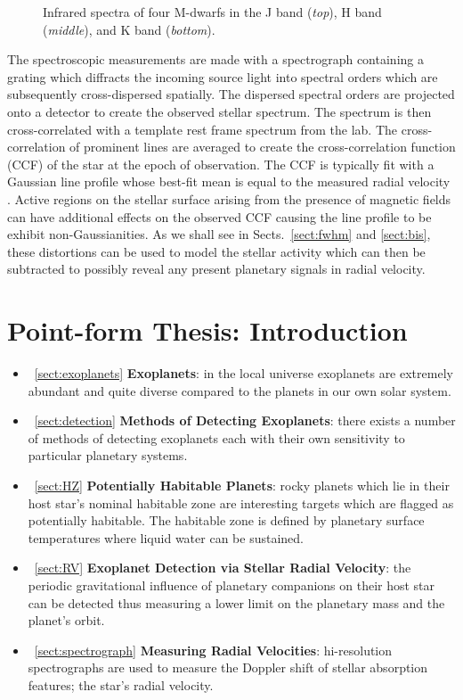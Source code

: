 \begin{figure}
\centering
\caption{Infrared spectra of four M-dwarfs in the J band (\emph{top}), H band 
(\emph{middle}), and K band (\emph{bottom}). \label{fig:spectra}}
\end{figure}

The spectroscopic measurements are made with a spectrograph containing a grating which 
diffracts the incoming source light into spectral orders which are subsequently 
cross-dispersed spatially. The dispersed spectral orders are projected onto a detector 
to create the observed stellar spectrum. The spectrum is then cross-correlated with a  
template rest frame spectrum from the lab. The cross-correlation of prominent lines 
are averaged to create the cross-correlation function (CCF) of the star at the epoch of 
observation. The CCF is typically fit with a Gaussian line profile whose best-fit mean 
is equal to the measured radial velocity \citep{pepe02}. 
Active regions on the stellar surface arising 
from the presence of magnetic fields can have additional effects on the observed CCF 
causing the line profile to be exhibit non-Gaussianities. 
As we shall see in Sects.~\ref{sect:fwhm} and \ref{sect:bis}, these distortions can 
be used to model the stellar activity which can then be subtracted to possibly reveal 
any present planetary signals in radial velocity.

\section{Point-form Thesis: Introduction}
\begin{itemize}
\renewcommand\labelitemi{--}
\item~\ref{sect:exoplanets} \textbf{Exoplanets}: in the local universe exoplanets are 
extremely abundant and quite diverse compared to the planets in our own solar system.
\item~\ref{sect:detection} \textbf{Methods of Detecting Exoplanets}: there exists a 
number of methods of detecting exoplanets each with their own sensitivity to particular 
planetary systems.
\item~\ref{sect:HZ} \textbf{Potentially Habitable Planets}: rocky planets which lie in 
their host star's nominal habitable zone are interesting targets which are flagged as 
potentially habitable. The habitable zone is defined by planetary surface temperatures 
where liquid water can be sustained.  
\item~\ref{sect:RV} \textbf{Exoplanet Detection via Stellar Radial Velocity}: the 
periodic gravitational influence of planetary companions on their host star can be 
detected thus measuring a lower limit on the planetary mass and the planet's orbit.
\item~\ref{sect:spectrograph} \textbf{Measuring Radial Velocities}: hi-resolution 
spectrographs are used to measure the Doppler shift of stellar absorption features; 
the star's radial velocity.
\end{itemize}
